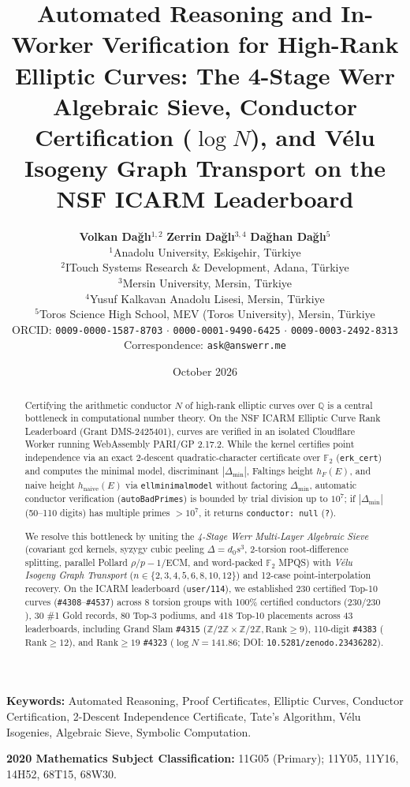 \documentclass[10pt,a4paper]{article}
\title{\textbf{Automated Reasoning and In-Worker Verification for High-Rank Elliptic Curves: The 4-Stage Werr Algebraic Sieve, Conductor Certification ($\log N$), and V\'{e}lu Isogeny Graph Transport on the NSF ICARM Leaderboard}}
\author{
    \textbf{Volkan Da\u{g}l\i}$^{1,2}$ \quad
    \textbf{Zerrin Da\u{g}l\i}$^{3,4}$ \quad
    \textbf{Da\u{g}han Da\u{g}l\i}$^{5}$ \\[0.65em]
    \small $^{1}$Anadolu University, Eski\c{s}ehir, T\"{u}rkiye \\
    \small $^{2}$ITouch Systems Research \& Development, Adana, T\"{u}rkiye \\
    \small $^{3}$Mersin University, Mersin, T\"{u}rkiye \\
    \small $^{4}$Yusuf Kalkavan Anadolu Lisesi, Mersin, T\"{u}rkiye \\
    \small $^{5}$Toros Science High School, MEV (Toros University), Mersin, T\"{u}rkiye \\[0.35em]
    \small ORCID: \texttt{0009-0000-1587-8703} $\cdot$ \texttt{0000-0001-9490-6425} $\cdot$ \texttt{0009-0003-2492-8313} \\
    \small Correspondence: \texttt{ask@answerr.me}
}
\date{\vspace{-0.7em}\small October 2026\vspace{-0.7em}}
\theoremstyle{plain}
\theoremstyle{definition}
\theoremstyle{remark}
\begin{document}
\maketitle

\begin{abstract}
Certifying the arithmetic conductor $N$ of high-rank elliptic curves over $\mathbb{Q}$ is a central bottleneck in computational number theory. On the NSF ICARM Elliptic Curve Rank Leaderboard (Grant DMS-2425401), curves are verified in an isolated Cloudflare Worker running WebAssembly PARI/GP 2.17.2. While the kernel certifies point independence via an exact 2-descent quadratic-character certificate over $\mathbb{F}_2$ (\texttt{erk\_cert}) and computes the minimal model, discriminant $|\Delta_{\min}|$, Faltings height $h_F(E)$, and naive height $h_{\text{naive}}(E)$ via \texttt{ellminimalmodel} without factoring $\Delta_{\min}$, automatic conductor verification (\texttt{autoBadPrimes}) is bounded by trial division up to $10^7$; if $|\Delta_{\min}|$ (50--110 digits) has multiple primes $> 10^7$, it returns \texttt{conductor:\ null} (\texttt{?}).

We resolve this bottleneck by uniting the \emph{4-Stage Werr Multi-Layer Algebraic Sieve} (covariant gcd kernels, syzygy cubic peeling $\Delta = d_0 s^3$, 2-torsion root-difference splitting, parallel Pollard $\rho$/$p-1$/ECM, and word-packed $\mathbb{F}_2$ MPQS) with \emph{V\'{e}lu Isogeny Graph Transport} ($n \in \{2,3,4,5,6,8,10,12\}$) and 12-case point-interpolation recovery. On the ICARM leaderboard (\texttt{user/114}), we established 230 certified Top-10 curves (\texttt{\#4308}--\texttt{\#4537}) across 8 torsion groups with 100\% certified conductors ($230/230$), 30 \#1 Gold records, 80 Top-3 podiums, and 418 Top-10 placements across 43 leaderboards, including Grand Slam \texttt{\#4315} ($\mathbb{Z}/2\mathbb{Z} \times \mathbb{Z}/2\mathbb{Z}, \mathrm{Rank} \ge 9$), 110-digit \texttt{\#4383} ($\mathrm{Rank} \ge 12$), and $\mathrm{Rank} \ge 19$ \texttt{\#4323} ($\log N = 141.86$; DOI: \texttt{10.5281/zenodo.23436282}).
\end{abstract}

\noindent\textbf{Keywords:} Automated Reasoning, Proof Certificates, Elliptic Curves, Conductor Certification, 2-Descent Independence Certificate, Tate's Algorithm, V\'{e}lu Isogenies, Algebraic Sieve, Symbolic Computation.

\smallskip
\noindent\textbf{2020 Mathematics Subject Classification:} 11G05 (Primary); 11Y05, 11Y16, 14H52, 68T15, 68W30.
\end{document}
